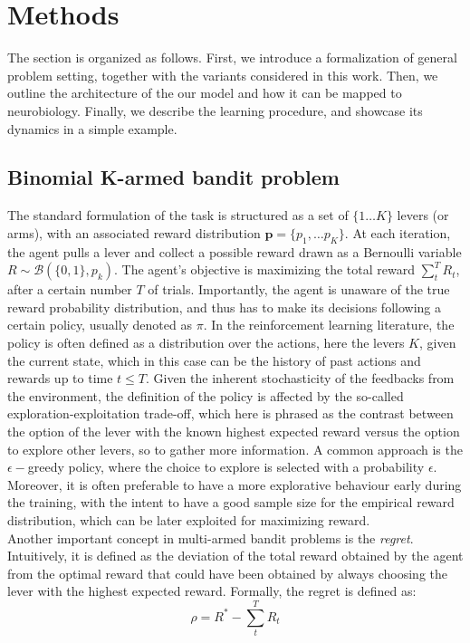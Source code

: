 

\section{Methods}

\noindent The section is organized as follows. First, we introduce a formalization of general problem setting, together with the variants considered in this work. Then, we outline the architecture of the our model and how it can be mapped to neurobiology. Finally, we describe the learning procedure,
and showcase its dynamics in a simple example.


\subsection{Binomial K-armed bandit problem}
\hfill \break
\noindent The standard formulation of the task is structured as a set of $\{1\dots K\}$ levers (or arms), with an associated reward distribution $\mathbf{p}=\{p_{1}, \ldots p_{K}\}$. At each iteration, the agent pulls a lever and collect a possible reward drawn as a Bernoulli variable $R\sim
\mathcal{B}(\{0,1\},p_{k})$. The agent's objective is maximizing the total reward
$\sum^{T}_{t} R_{t}$, after a certain number $T$ of trials. Importantly, the agent is unaware of the true reward probability distribution, and thus has to make its decisions following a certain policy, usually denoted as $\pi$. In the reinforcement learning literature, the policy is often defined as
a distribution over the actions, here the levers $K$, given the current state, which in this case can be the history of past actions and rewards up to time $t\leq T$. Given the inherent stochasticity of the feedbacks from the environment, the definition of the policy is affected by the so-called
exploration-exploitation trade-off, which here is phrased as the contrast between the option of the lever with the known highest expected reward versus the option to explore other levers, so to gather more information. A common approach is the $\epsilon-$greedy policy, where the choice to explore is
selected with a probability $\epsilon$. Moreover, it is often preferable to have a more explorative behaviour early during the training, with the intent to have a good sample size for the empirical reward distribution, which can be later exploited for maximizing reward.\\
Another important concept in multi-armed bandit problems is the \textit{regret}. Intuitively, it is defined as the deviation of the total reward obtained by the agent from the optimal reward that could have been obtained by always choosing the lever with the highest expected reward. Formally, the regret is defined as:
\begin{equation}
    \rho=R^{*} - \sum^{T}_{t} R_{t}
\end{equation}

